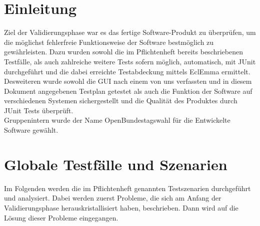 \documentclass[12pt,a4paper,titlepage]{article}
\begin{document}
\section{Einleitung}

Ziel der Validierungsphase war es das fertige Software-Produkt zu überprüfen, um die möglichst fehlerfreie Funktionsweise der Software bestmöglich zu gewährleisten. Dazu wurden sowohl die im Pflichtenheft bereits beschriebenen Testfälle, als auch zahlreiche weitere Tests sofern möglich, automatisch, mit JUnit durchgeführt und die dabei erreichte Testabdeckung mittels EclEmma ermittelt.
Desweiteren wurde sowohl die GUI nach einem von uns verfassten und in diesem Dokument angegebenen Testplan getestet als auch die Funktion der Software auf verschiedenen Systemen sichergestellt und die Qualität des Produktes durch JUnit Tests überprüft.
\\
Gruppenintern wurde der Name OpenBundestagswahl für die Entwickelte Software gewählt.

\section{Globale Testfälle und Szenarien}
Im Folgenden werden die im Pflichtenheft genannten Testszenarien durchgeführt und analysiert. Dabei werden zuerst Probleme, die sich am Anfang der Validierungsphase herauskristallisiert haben, beschrieben. Dann wird auf die Lösung dieser Probleme eingegangen.
\end{document}
